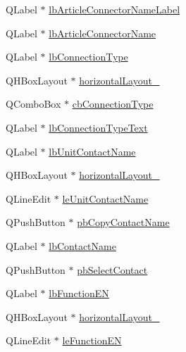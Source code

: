 \begin{DoxyCompactItemize}
Q\-Label $\ast$ \hyperlink{class_ui__mdt_cl_unit_connection_dialog_a2766403cf829a30b2b12fc545d9e4786}{lb\-Article\-Connector\-Name\-Label}
\item 
Q\-Label $\ast$ \hyperlink{class_ui__mdt_cl_unit_connection_dialog_a6456badeda08ce61f9bd8e569e3c9a87}{lb\-Article\-Connector\-Name}
\item 
Q\-Label $\ast$ \hyperlink{class_ui__mdt_cl_unit_connection_dialog_a8b3061a8270e195d9781fbc20061c04d}{lb\-Connection\-Type}
\item 
Q\-H\-Box\-Layout $\ast$ \hyperlink{class_ui__mdt_cl_unit_connection_dialog_a33d0f0100bc144b8a383f5140afbadc0}{horizontal\-Layout\-\_}
\item 
Q\-Combo\-Box $\ast$ \hyperlink{class_ui__mdt_cl_unit_connection_dialog_aaea7692576ca1faa994ed113ec00bc0a}{cb\-Connection\-Type}
\item 
Q\-Label $\ast$ \hyperlink{class_ui__mdt_cl_unit_connection_dialog_a4598e20b2e24d1eb51ab7d0b1923885d}{lb\-Connection\-Type\-Text}
\item 
Q\-Label $\ast$ \hyperlink{class_ui__mdt_cl_unit_connection_dialog_a407b18b7bfbd0b873ff30a57f97724f1}{lb\-Unit\-Contact\-Name}
\item 
Q\-H\-Box\-Layout $\ast$ \hyperlink{class_ui__mdt_cl_unit_connection_dialog_a610262bd8de01128d37494e0c8c56705}{horizontal\-Layout\-\_}
\item 
Q\-Line\-Edit $\ast$ \hyperlink{class_ui__mdt_cl_unit_connection_dialog_a62724c4b19bf950fccfc746efb4b7384}{le\-Unit\-Contact\-Name}
\item 
Q\-Push\-Button $\ast$ \hyperlink{class_ui__mdt_cl_unit_connection_dialog_aa407022db4e9256566194c987624278f}{pb\-Copy\-Contact\-Name}
\item 
Q\-Label $\ast$ \hyperlink{class_ui__mdt_cl_unit_connection_dialog_a20934d29e80c28ad87b0139a5fedf08e}{lb\-Contact\-Name}
\item 
Q\-Push\-Button $\ast$ \hyperlink{class_ui__mdt_cl_unit_connection_dialog_a61cc80762082f8291dedbac6e96d55d4}{pb\-Select\-Contact}
\item 
Q\-Label $\ast$ \hyperlink{class_ui__mdt_cl_unit_connection_dialog_a936d55c8db696996c5c4f24e76848907}{lb\-Function\-E\-N}
\item 
Q\-H\-Box\-Layout $\ast$ \hyperlink{class_ui__mdt_cl_unit_connection_dialog_ac21c3b0a11aa9aa26acb765165a6dabf}{horizontal\-Layout\-\_}
\item 
Q\-Line\-Edit $\ast$ \hyperlink{class_ui__mdt_cl_unit_connection_dialog_a550a9bd42dc46cbea3060bffc10f7f31}{le\-Function\-E\-N}

\end{DoxyCompactItemize}
